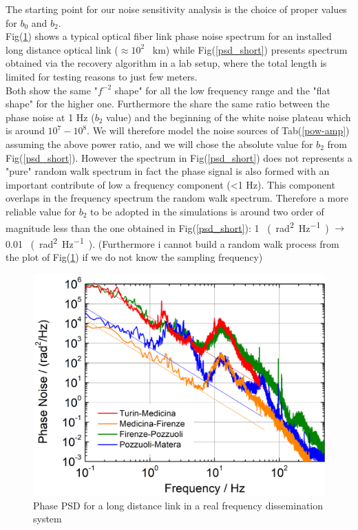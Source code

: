 \documentclass[ fontsize=11pt]{scrartcl} %
\numberwithin{equation}{section} %
\numberwithin{figure}{section} %
\numberwithin{table}{section} %
\begin{document}
The starting point for our noise sensitivity analysis is the choice of proper values for $b_0$ and $b_2$.\\ Fig(\ref{psd_long}) shows a typical optical fiber link phase noise spectrum for an installed long distance optical link  ($\approx 10^2$ \SI{}{\kilo\meter}) while Fig(\ref{psd_short}) presents spectrum obtained via the recovery algorithm in a lab setup, where the total length is limited for testing reasons to just  few meters.\\
Both show the same "$f^{-2}$ shape" for all the low frequency range and the "flat shape" for the higher one.
Furthermore the share the same ratio between the phase noise at 1 Hz ($b_2$ value) and the beginning of the white noise plateau which is around $10^{7}-10^{8}$.
We will therefore model the noise sources of Tab(\ref{pow-amp}) assuming the above power ratio, and we will chose the absolute value for $b_2$ from Fig(\ref{psd_short}). However the spectrum in Fig(\ref{psd_short}) does not represents a "pure" random walk spectrum in fact the phase signal is also formed with an important contribute of low a frequency component (<1 Hz). This component overlaps in the frequency spectrum the random walk spectrum. Therefore a more reliable value for $b_2$ to be adopted in the simulations is around two order of magnitude less than the one obtained in Fig(\ref{psd_short}): 1 \SI{}{(\radian\squared\per\hertz)} $\rightarrow$ 0.01 \SI{}{(\radian\squared\per\hertz)}. (Furthermore i cannot build a random walk process from the plot of Fig(\ref{psd_long}) if we do not know the sampling frequency)

\begin{figure}[hbtp]
\centering
\includegraphics[scale=0.45]{immagini_noise/noise_long.png}
\caption{Phase PSD for a long distance link in a real frequency dissemination system}
\label{psd_long}
\end{figure}
\end{document}
